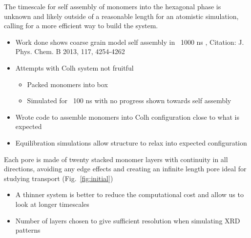 \documentclass{article}
\begin{document}
\begin{itemize}
	The timescale for self assembly of monomers into the hexagonal phase is unknown and likely outside of a reasonable length for an atomistic simulation, calling for a more efficient way to build the system. 
	\begin{itemize}
		\item Work done shows coarse grain model self assembly in ~1000 ns , Citation: J. Phys. Chem. B 2013, 117, 4254-4262
		\item Attempts with Colh system not fruitful  
		\begin{itemize}
			\item Packed monomers into box
			\item Simulated for ~100 ns with no progress shown towards self assembly
		\end{itemize}  
		\item Wrote code to assemble monomers into Colh configuration close to what is expected 
		\item Equilibration simulations allow structure to relax into expected configuration 
	\end{itemize}
	
	Each pore is made of twenty stacked monomer layers with continuity in all directions, avoiding any edge effects and creating an infinite length pore ideal for studying transport (Fig.~\ref{fig:initial})
	\begin{itemize}
		\item A thinner system is better to reduce the computational cost and allow us to look at longer timescales
		\item Number of layers chosen to give sufficient resolution when simulating XRD patterns


\end{itemize}
\end{itemize}
\end{document}
